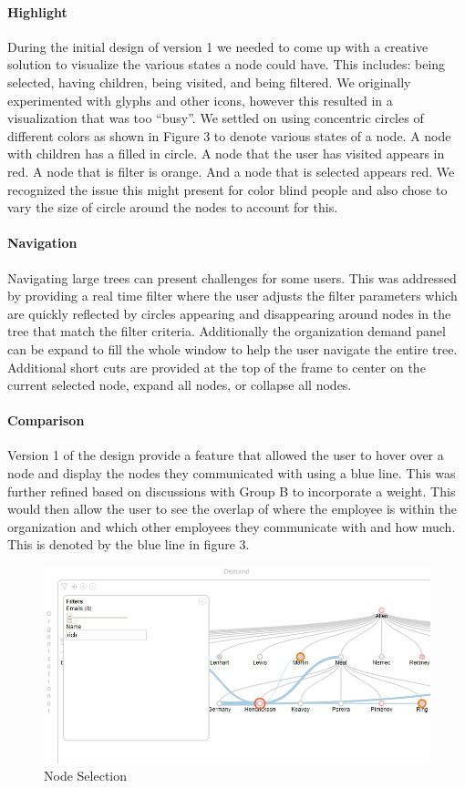 \documentclass[journal]{vgtc}                %
\begin{document}
\paragraph{Highlight}
During the initial design of version 1 we needed to come up with a creative solution to visualize the various states a node could have.  This includes: being selected, having children, being visited, and being filtered.  We originally experimented with glyphs and other icons, however this resulted in a visualization that was too ``busy''.  We settled on using concentric circles of different colors as shown in Figure 3 to denote various states of a node.  A node with children has a filled in circle.  A node that the user has visited appears in red.  A node that is filter is orange. And a node that is selected appears red.  We recognized the issue this might present for color blind people and also chose to vary the size of circle around the nodes to account for this.

\paragraph{Navigation}
Navigating large trees can present challenges for some users.  This was addressed by providing a real time filter where the user adjusts the filter parameters which are quickly reflected by circles appearing and disappearing around nodes in the tree that match the filter criteria.  Additionally the organization demand panel can be expand to fill the whole window to help the user navigate the entire tree.  Additional short cuts are provided at the top of the frame to center on the current selected node, expand all nodes, or collapse all nodes.

\paragraph{Comparison}
Version 1 of the design provide a feature that allowed the user to hover over a node and display the nodes they communicated with using a blue line.  This was further refined based on discussions with Group B to incorporate a weight.  This would then allow the user to see the overlap of where the employee is within the organization and which other employees they communicate with and how much.  This is denoted by the blue line in figure 3.

\begin{figure}
	\centering
	\includegraphics[width=\columnwidth]{pictures/orgdemand.jpg}
	\caption{Node Selection}
	\label{fig:node}
\end{figure}
\end{document}
